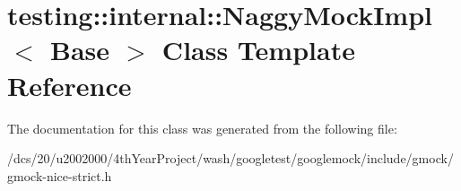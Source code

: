 \hypertarget{classtesting_1_1internal_1_1NaggyMockImpl}{}\section{testing\+:\+:internal\+:\+:Naggy\+Mock\+Impl$<$ Base $>$ Class Template Reference}
\label{classtesting_1_1internal_1_1NaggyMockImpl}


The documentation for this class was generated from the following file\+:\begin{DoxyCompactItemize}
\item 
/dcs/20/u2002000/4th\+Year\+Project/wash/googletest/googlemock/include/gmock/gmock-\/nice-\/strict.\+h\end{DoxyCompactItemize}
